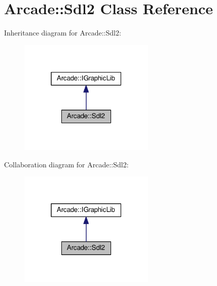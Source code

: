 \hypertarget{class_arcade_1_1_sdl2}{}\section{Arcade\+:\+:Sdl2 Class Reference}
\label{class_arcade_1_1_sdl2}


Inheritance diagram for Arcade\+:\+:Sdl2\+:
\nopagebreak
\begin{figure}[H]
\begin{center}
\leavevmode
\includegraphics[width=183pt]{class_arcade_1_1_sdl2__inherit__graph}
\end{center}
\end{figure}


Collaboration diagram for Arcade\+:\+:Sdl2\+:
\nopagebreak
\begin{figure}[H]
\begin{center}
\leavevmode
\includegraphics[width=183pt]{class_arcade_1_1_sdl2__coll__graph}
\end{center}
\end{figure}
